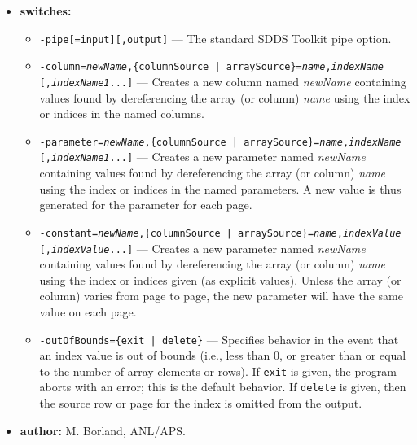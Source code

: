 \begin{itemize}
\item {\bf switches:} 
    \begin{itemize} 
   \item {\tt -pipe[=input][,output]} --- The standard SDDS Toolkit pipe option. 
    \item {\tt -column={\em newName},\{columnSource | arraySource\}={\em name},{\em indexName}} \\
        {\tt [,{\em indexName1}...]}
    --- Creates a new column named {\em newName} containing values 
    found by dereferencing the array (or column) {\em name} 
    using the index or indices in the named columns. 
    \item {\tt -parameter={\em newName},\{columnSource | arraySource\}={\em name},{\em indexName}}\\
         {\tt [,{\em indexName1}...]}
    --- Creates a new parameter named {\em newName} containing values 
    found by dereferencing the array (or column) {\em name} 
    using the index or indices in the named parameters.  A new value 
    is thus generated for the parameter for each page. 
    \item {\tt -constant={\em newName},\{columnSource | arraySource\}={\em name},{\em indexValue}}\\
         {\tt [,{\em indexValue}...]}  
    --- Creates a new parameter named {\em newName} containing values 
    found by dereferencing the array (or column) {\em name} using 
    the index or indices given (as explicit values).  Unless the array (or 
    column) varies from page to page, the new parameter will have the 
    same value on each page. 
    \item {\tt -outOfBounds=\{exit | delete\}} --- Specifies behavior in the event
        that an index value is out of bounds (i.e., less than 0, or greater than
        or equal to the number of array elements or rows).  If {\tt exit} is given,
        the program aborts with an error; this is the default behavior.
        If {\tt delete} is given, then the source row or page for the index
        is omitted from the output.
    \end{itemize} 
\item {\bf author:} M. Borland, ANL/APS. 
\end{itemize} 
